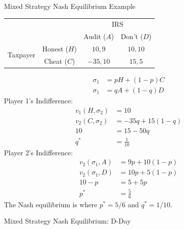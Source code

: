\documentclass[10pt]{extarticle}
\begin{document}
  \begin{problem}{Mixed Strategy Nash Equilibrium Example}
    \begin{center}
      \renewcommand{\arraystretch}{1.5}
      \begin{tabular}{cc|c|c|}
        \multicolumn{1}{c}{}&\multicolumn{1}{c}{}&\multicolumn{2}{c}{IRS}\\
                            &\multicolumn{1}{c}{}&\multicolumn{1}{c}{Audit ($A$)} & \multicolumn{1}{c}{Don't ($D$)}\\
        \cline{3-4}
        \multirow{2}{4em}{Taxpayer} & Honest ($H$) & $10,9$ & $10,10$ \\
        \cline{3-4}
                                    & Cheat ($C$) & $-35,10$ & $15,5$\\
        \cline{3-4}
      \end{tabular}
    \end{center}
    \begin{align*}
      \sigma_1 &= pH + (1-p) C\\
      \sigma_1 &= qA + (1-q) D
    \end{align*}
    Player 1's Indifference:
    \begin{align*}
      v_1(H,\sigma_2) &= 10\\
      v_2(C,\sigma_2) &= -35q + 15(1-q)\\
      10 &= 15-50q\tag*{when taxpayer will be indifferent}\\
      q^* &= \frac{1}{10}
    \end{align*}
    Player 2's Indifference:
    \begin{align*}
      v_2(\sigma_1,A) &= 9p + 10(1-p)\\
      v_2(\sigma_1,D) &= 10p + 5(1-p)\\
      10-p &= 5+5p \\
      p^* &= \frac{5}{6}
    \end{align*}
    The Nash equilibrium is where $p^* = 5/6$ and $q^* = 1/10$.
  \end{problem}
  \begin{problem}{Mixed Strategy Nash Equilibrium: D-Day}
    \begin{tcbraster}[raster columns = 1,colframe = black!75!white,colback=white]
    \end{tcbraster}
  \end{problem}
\end{document}
